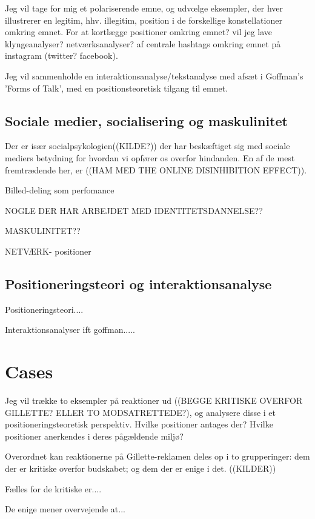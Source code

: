 Jeg vil tage for mig et polariserende emne, og udvœlge eksempler, der hver
illustrerer en legitim, hhv. illegitim, position i de forskellige
konstellationer omkring emnet.   For at kortlægge positioner
omkring emnet? vil jeg lave klyngeanalyser?  netværksanalyser? af
centrale hashtags omkring emnet på instagram (twitter?  facebook).

Jeg vil sammenholde en interaktionsanalyse/tekstanalyse med afsæt
i Goffman's 'Forms of Talk', med en positionsteoretisk tilgang til
emnet. 

\subsection{Sociale medier, socialisering og maskulinitet} 

Der er især socialpsykologien((KILDE?)) der har beskæftiget sig
med sociale mediers betydning for hvordan vi opfører os overfor
hindanden. En af de mest fremtrædende her, er ((HAM MED THE ONLINE
DISINHIBITION EFFECT)). 

Billed-deling som perfomance

NOGLE DER HAR ARBEJDET MED IDENTITETSDANNELSE??

MASKULINITET??

NETVÆRK- positioner

\subsection{Positioneringsteori og interaktionsanalyse}

Positioneringsteori....

Interaktionsanalyser ift goffman.....

\section{Cases}
Jeg vil trække to eksempler på reaktioner ud ((BEGGE KRITISKE
OVERFOR GILLETTE?  ELLER TO MODSATRETTEDE?), og analysere disse i
et positioneringsteoretisk perspektiv.  Hvilke positioner antages
der? Hvilke positioner anerkendes i deres pågældende miljø?



Overordnet kan reaktionerne på Gillette-reklamen deles op i to
grupperinger: dem der er kritiske overfor budskabet; og dem der er
enige i det. ((KILDER))

Fælles for de kritiske er....

De enige mener overvejende at...


